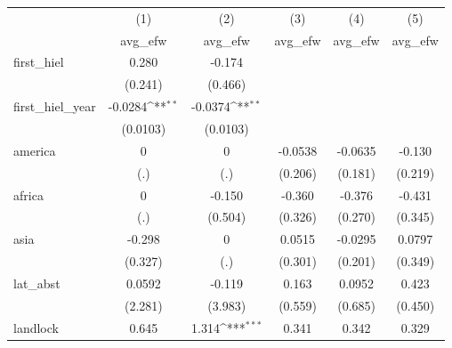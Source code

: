 {
\def\sym#1{\ifmmode^{#1}\else\(^{#1}\)\fi}
\begin{tabular}{l*{5}{c}}
\hline\hline
            &\multicolumn{1}{c}{(1)}&\multicolumn{1}{c}{(2)}&\multicolumn{1}{c}{(3)}&\multicolumn{1}{c}{(4)}&\multicolumn{1}{c}{(5)}\\
            &\multicolumn{1}{c}{avg\_efw}&\multicolumn{1}{c}{avg\_efw}&\multicolumn{1}{c}{avg\_efw}&\multicolumn{1}{c}{avg\_efw}&\multicolumn{1}{c}{avg\_efw}\\
\hline
first\_hiel  &       0.280         &      -0.174         &                     &                     &                     \\
            &     (0.241)         &     (0.466)         &                     &                     &                     \\
[1em]
first\_hiel\_year&     -0.0284\sym{**} &     -0.0374\sym{**} &                     &                     &                     \\
            &    (0.0103)         &    (0.0103)         &                     &                     &                     \\
[1em]
america     &           0         &           0         &     -0.0538         &     -0.0635         &      -0.130         \\
            &         (.)         &         (.)         &     (0.206)         &     (0.181)         &     (0.219)         \\
[1em]
africa      &           0         &      -0.150         &      -0.360         &      -0.376         &      -0.431         \\
            &         (.)         &     (0.504)         &     (0.326)         &     (0.270)         &     (0.345)         \\
[1em]
asia        &      -0.298         &           0         &      0.0515         &     -0.0295         &      0.0797         \\
            &     (0.327)         &         (.)         &     (0.301)         &     (0.201)         &     (0.349)         \\
[1em]
lat\_abst    &      0.0592         &      -0.119         &       0.163         &      0.0952         &       0.423         \\
            &     (2.281)         &     (3.983)         &     (0.559)         &     (0.685)         &     (0.450)         \\
[1em]
landlock    &       0.645         &       1.314\sym{***}&       0.341         &       0.342         &       0.329         \\

\end{tabular}}
